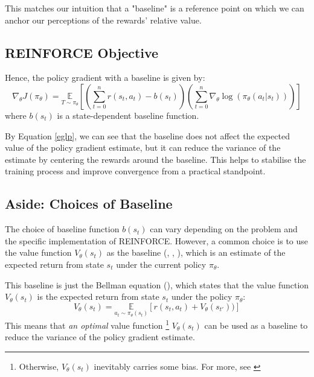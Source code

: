 \documentclass{article} %
\begin{document}
This matches our intuition that a "baseline" is a reference point on which we can anchor
our perceptions of the rewards' relative value. 

\subsection{REINFORCE Objective}

Hence, the policy gradient with a baseline is given by:
\begin{equation} \label{policy_gradient_baseline}
    \nabla_\theta J(\pi_\theta) = \underset{T \sim \pi_\theta}{\mathbb{E}} \left[\left(\sum_{t=0}^{n} r(s_t, a_t) - b(s_t) \right)  \left(\sum_{t=0}^{n} \nabla_\theta \log(\pi_\theta(a_t | s_t))\right) \right]
\end{equation}
where $b(s_t)$ is a state-dependent baseline function.

By Equation \eqref{eglp}, we can see that the baseline does not affect the expected value of the policy gradient estimate,
but it can reduce the variance of the estimate by centering the rewards around the baseline.
This helps to stabilise the training process and improve convergence from a practical standpoint.

\subsection{Aside: Choices of Baseline}
The choice of baseline function $b(s_t)$ can vary depending on the problem and the specific implementation of REINFORCE.
However, a common choice is to use the value function $V_\theta(s_t)$ as the baseline (\cite{SpinningUp-2018}, \cite{Sutton-and-Barto-1998}, \cite{Weng-2018}), which is an estimate of the expected return from state $s_t$ under the current policy $\pi_\theta$.

This baseline is just the Bellman equation (\cite{Sutton-and-Barto-1998}), which states that the value function $V_\theta(s_t)$ is the expected return from state $s_t$ under the policy $\pi_\theta$:
\begin{equation} \label{value_function}
    V_\theta(s_t) = \underset{a_t \sim \pi_\theta(s_t)}{\mathbb{E}} \left[ r(s_t, a_t) + V_\theta(s_{t'})) \right]
\end{equation}
This means that \textit{an optimal} value function \footnote{Otherwise, $V_\theta(s_t)$ inevitably carries some bias. For more, see \cite{Schulman-et-al-2016}} 
$V_\theta(s_t)$ can be used as a baseline to reduce the variance of the policy gradient estimate.
\end{document}
